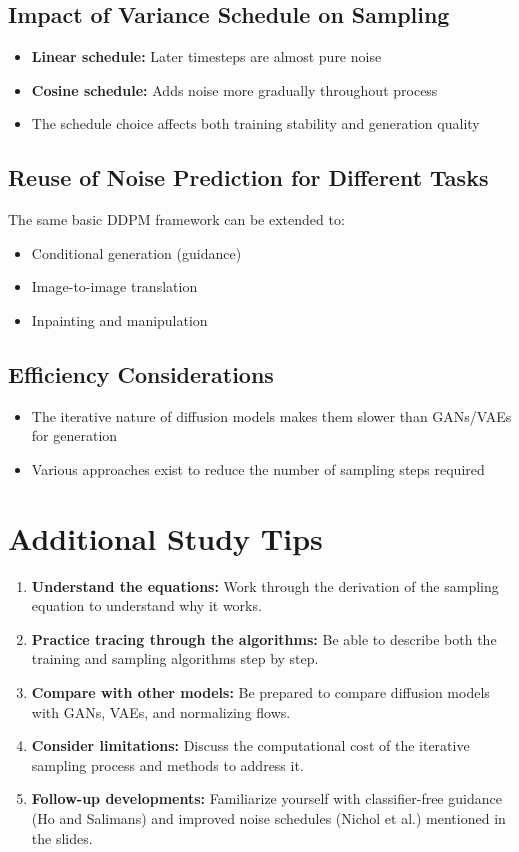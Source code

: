\subsection*{Impact of Variance Schedule on Sampling}
\begin{itemize}
    \item \textbf{Linear schedule:} Later timesteps are almost pure noise
    \item \textbf{Cosine schedule:} Adds noise more gradually throughout process
    \item The schedule choice affects both training stability and generation quality
\end{itemize}

\subsection*{Reuse of Noise Prediction for Different Tasks}
The same basic DDPM framework can be extended to:
\begin{itemize}
    \item Conditional generation (guidance)
    \item Image-to-image translation
    \item Inpainting and manipulation
\end{itemize}

\subsection*{Efficiency Considerations}
\begin{itemize}
    \item The iterative nature of diffusion models makes them slower than GANs/VAEs for generation
    \item Various approaches exist to reduce the number of sampling steps required
\end{itemize}

\section{Additional Study Tips}
\begin{enumerate}
    \item \textbf{Understand the equations:} Work through the derivation of the sampling equation to understand why it works.
    \item \textbf{Practice tracing through the algorithms:} Be able to describe both the training and sampling algorithms step by step.
    \item \textbf{Compare with other models:} Be prepared to compare diffusion models with GANs, VAEs, and normalizing flows.
    \item \textbf{Consider limitations:} Discuss the computational cost of the iterative sampling process and methods to address it.
    \item \textbf{Follow-up developments:} Familiarize yourself with classifier-free guidance (Ho and Salimans) and improved noise schedules (Nichol et al.) mentioned in the slides.
\end{enumerate}

